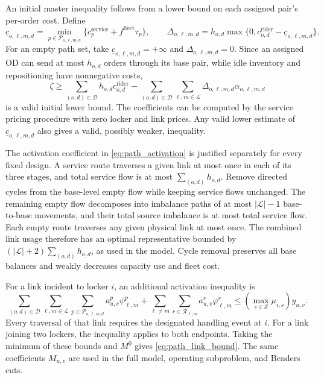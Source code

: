 \documentclass[final,3p,authoryear]{elsarticle}
\begin{document}
An initial master inequality follows from a lower bound on each assigned pair's per-order cost.
Define
\begin{equation}
 \underline c_{o,\ell,m,d}
 =\min_{p\in\mathcal P_{o,\ell,m,d}}
 \{c_p^{\mathrm{service}}+f^{\mathrm{fleet}}\tau_p\},
 \qquad
 \Delta_{o,\ell,m,d}
 =h_{o,d}\max\{0,c_{o,d}^{\mathrm{rider}}-\underline c_{o,\ell,m,d}\}.
 \label{eq:path_saving_bound}
\end{equation}
For an empty path set, take $\underline c_{o,\ell,m,d}=+\infty$ and $\Delta_{o,\ell,m,d}=0$.
Since an assigned OD can send at most $h_{o,d}$ orders through its base pair, while idle inventory and repositioning have nonnegative costs,
\begin{equation}
 \zeta\ge
 \sum_{(o,d)\in\mathcal D}h_{o,d}c_{o,d}^{\mathrm{rider}}
 -\sum_{(o,d)\in\mathcal D}\sum_{\ell,m\in\mathcal L}
 \Delta_{o,\ell,m,d}\alpha_{o,\ell,m,d}
 \label{eq:path_initial_cut}
\end{equation}
is a valid initial lower bound.
The coefficients can be computed by the service pricing procedure with zero locker and link prices.
Any valid lower estimate of $\underline c_{o,\ell,m,d}$ also gives a valid, possibly weaker, inequality.

The activation coefficient in \eqref{eq:path_activation} is justified separately for every fixed design.
A service route traverses a given link at most once in each of its three stages, and total service flow is at most $\sum_{(o,d)}h_{o,d}$.
Remove directed cycles from the base-level empty flow while keeping service flows unchanged.
The remaining empty flow decomposes into imbalance paths of at most $|\mathcal L|-1$ base-to-base movements, and their total source imbalance is at most total service flow.
Each empty route traverses any given physical link at most once.
The combined link usage therefore has an optimal representative bounded by $(|\mathcal L|+2)\sum_{(o,d)}h_{o,d}$, as used in the model.
Cycle removal preserves all base balances and weakly decreases capacity use and fleet cost.

For a link incident to locker $i$, an additional activation inequality is
\begin{equation}
 \sum_{(o,d)\in\mathcal D}\sum_{\ell,m\in\mathcal L}
 \sum_{p\in\mathcal P_{o,\ell,m,d}}a_{u,v}^p\psi_{\ell,m}^{p}
 +\sum_{\ell\ne m}\sum_{r\in\mathcal R_{\ell,m}}a_{u,v}^r\varphi_{\ell,m}^{r}
 \le \left(\max_{s\in\mathcal S}\mu_{i,s}\right)y_{u,v}.
 \label{eq:path_locker_link_cut}
\end{equation}
Every traversal of that link requires the designated handling event at $i$.
For a link joining two lockers, the inequality applies to both endpoints.
Taking the minimum of these bounds and $M^0$ gives \eqref{eq:path_link_bound}.
The same coefficients $M_{u,v}$ are used in the full model, operating subproblem, and Benders cuts.
\end{document}
